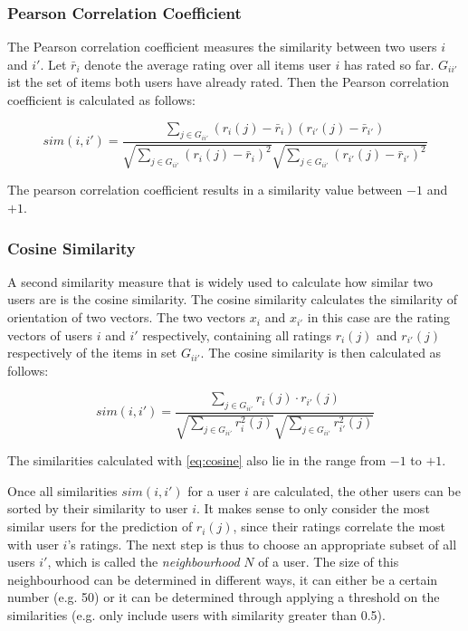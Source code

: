 \subsubsection{Pearson Correlation Coefficient}
\label{ssst:pearsoncorrelationcoefficient} The Pearson correlation coefficient measures the similarity between two users $i$ and $i'$. Let $\bar{r}_i$ denote the average rating over all items user $i$ has rated so far. $G_{ii'}$ ist the set of items both users have already rated. Then the Pearson correlation coefficient is calculated as follows:

\begin{equation}
sim(i,i') = \frac{\sum_{j \in G_{ii'}}{(r_i(j)-\bar{r}_i)(r_{i'}(j)-\bar{r}_{i'})}}{\sqrt{\sum_{j \in G_{ii'}}{(r_i(j)-\bar{r}_i)^2}}\sqrt{\sum_{j \in G_{ii'}}{(r_{i'}(j)-\bar{r}_{i'})^2}}}
\label{eq:pearson}
\end{equation}

The pearson correlation coefficient results in a similarity value between $-1$ and $+1$.

\subsubsection{Cosine Similarity}
\label{ssst:cosinesimilarity} A second similarity measure that is widely used to calculate how similar two users are is the cosine similarity. The cosine similarity calculates the similarity of orientation of two vectors. The two vectors $x_i$ and $x_{i'}$ in this case are the rating vectors of users $i$ and $i'$ respectively, containing all ratings $r_{i}(j)$ and $r_{i'}(j)$ respectively of the items in set $G_{ii'}$. The cosine similarity is then calculated as follows:

\begin{equation}
sim(i,i') = \frac{\sum_{j \in G_{ii'}}{r_{i}(j)\cdot r_{i'}(j)}}{\sqrt{\sum_{j \in G_{ii'}}{{r_{i}^2}(j)}}\sqrt{\sum_{j \in G_{ii'}}{{r_{i'}^2}(j)}}}
\label{eq:cosine}
\end{equation}

The similarities calculated with \eqref{eq:cosine} also lie in the range from $-1$ to $+1$.
\newline

Once all similarities $sim(i,i')$ for a user $i$ are calculated, the other users can be sorted by their similarity to user $i$. It makes sense to only consider the most similar users for the prediction of $\hat{r}_i(j)$, since their ratings correlate the most with user $i$'s ratings. The next step is thus to choose an appropriate subset of all users $i'$, which is called the \textit{neighbourhood} $N$ of a user. The size of this neighbourhood can be determined in different ways, it can either be a certain number (e.g. 50) or it can be determined through applying a threshold on the similarities (e.g. only include users with similarity greater than 0.5).

